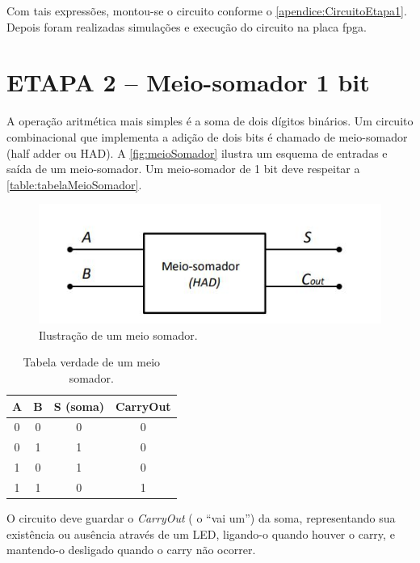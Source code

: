 		Com tais expressões, montou-se o circuito conforme o \autoref{apendice:CircuitoEtapa1}.
		Depois foram realizadas simulações e execução do circuito na placa \ac{fpga}.

	\section{ETAPA 2 – Meio-somador 1 bit}

		A operação aritmética mais simples é a soma de dois dígitos binários. Um circuito combinacional
		que implementa a adição de dois bits é chamado de meio-somador (half adder ou HAD).
		A \autoref{fig:meioSomador} ilustra um esquema de entradas e saída de um meio-somador.
		Um meio-somador de 1 bit deve respeitar a \autoref{table:tabelaMeioSomador}.

		\begin{figure}[H]
			\centering
			\caption{\label{fig:meioSomador}Ilustração de um meio somador.}
			\includegraphics[width=1\textwidth]{img/meioSomador}
		\end{figure}

		\begin{table}[h]
			\centering
			\caption{Tabela verdade de um meio somador.}
			\label{table:tabelaMeioSomador}
			\begin{tabular}{c|c|c|c}
				\textbf{A} & \textbf{B} & \textbf{S (soma)} & \textbf{CarryOut} \\
				\hline
				0 & 0 & 0 & 0\\
				0 & 1 & 1 & 0\\
				1 & 0 & 1 & 0\\
				1 & 1 & 0 & 1\\
			\end{tabular}
		\end{table}

		O circuito deve guardar o \textit{CarryOut} ( o “vai um”) da soma, representando sua existência
		ou ausência através de um LED, ligando-o quando houver o carry, e mantendo-o desligado quando
		o carry não ocorrer.


